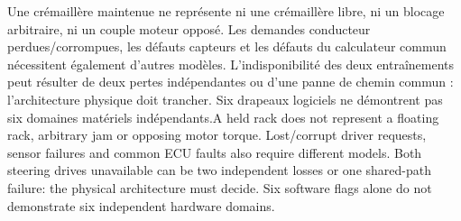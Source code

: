 \documentclass[11pt,a4paper,oneside]{report}
\newcommand{\bi}[2]{\iffrench #2\else #1\fi}
\begin{document}
\bi{A held rack does not represent a floating rack, arbitrary jam or opposing motor torque. Lost/corrupt driver requests, sensor failures and common ECU faults also require different models. Both steering drives unavailable can be two independent losses or one shared-path failure: the physical architecture must decide. Six software flags alone do not demonstrate six independent hardware domains.}{Une crémaillère maintenue ne représente ni une crémaillère libre, ni un blocage arbitraire, ni un couple moteur opposé. Les demandes conducteur perdues/corrompues, les défauts capteurs et les défauts du calculateur commun nécessitent également d'autres modèles. L'indisponibilité des deux entraînements peut résulter de deux pertes indépendantes ou d'une panne de chemin commun : l'architecture physique doit trancher. Six drapeaux logiciels ne démontrent pas six domaines matériels indépendants.}
\end{document}

